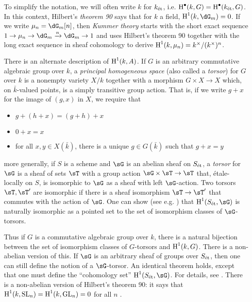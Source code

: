 \documentclass{article}
\begin{document}
To simplify the notation, we will often write $k$ for ${k}_\textnormal{\'et}$, i.e. 
$\operatorname{H}^\bullet(k,G) = \operatorname{H}^\bullet({k}_\textnormal{\'et},G)$. In this context, Hilbert's 
\emph{theorem 90} says that for $k$ a field, $\h^1(k,\dG_m) = 0$. If we write 
$\mu_n = \dG_m[n]$, then \emph{Kummer theory} starts with the short exact 
sequence $1\to \mu_n\to \dG_m\xrightarrow n \dG_m \to 1$ and uses Hilbert's 
theorem 90 together with the long exact sequence in sheaf cohomology to derive 
$\operatorname{H}^1(k,\mu_n) = k^\times / (k^\times)^n$. 

There is an alternate description of $\operatorname{H}^1(k,A)$. If $G$ is an arbitrary 
commutative algebraic group over $k$, a \emph{principal homogeneous space} 
(also called a \emph{torsor}) for $G$ over $k$ is a nonempty variety $X/k$ 
together with a morphism $G\times X\to X$ which, on $\bar k$-valued points, is 
a simply transitive group action. That is, if we write $g+x$ for the 
image of $(g,x)$ in $X$, we require that 
\begin{itemize}
  \item $g+(h+x) = (g+h)+x$ 
  \item $0+x = x$
  \item for all $x,y\in X(\bar k)$, there is a unique $g\in G(\bar k)$ such 
    that $g+x = y$
\end{itemize}
more generally, if $S$ is a scheme and $\sG$ is an abelian sheaf on ${S}_\textnormal{\'et}$, a 
\emph{torsor} for $\sG$ is a sheaf of sets $\sT$ with a group action 
$\sG\times \sT\to\sT$ that, \'etale-locally on $S$, is isomorphic to $\sG$ as 
a sheaf with left $\sG$-action. Two torsors $\sT,\sT'$ are isomorphic if there 
is a sheaf isomorphism $\sT\to \sT'$ that commutes with the action of $\sG$. 
One can show (see e.g. \cite[IV 1.1]{de77}) that $\h^1(\et S,\sG)$ is 
naturally isomorphic as a pointed set to the set of isomorphism classes of 
$\sG$-torsors. 

Thus if $G$ is a commutative algebraic group over $k$, there is a natural 
bijection between the set of isomorphism classes of $G$-torsors and 
$\operatorname{H}^1(k,G)$. There is a non-abelian version of this. If $\sG$ is an arbitrary 
sheaf of groups over ${S}_\textnormal{\'et}$, then one can still define the notion of a 
$\sG$-torsor. An identical theorem holds, except that one must define the 
``cohomology set'' $\h^1(\et S,\sG)$. For details, see \cite{sk01}. There is a 
non-abelian version of Hilbert's theorem 90: it says that 
$\operatorname{H}^1(k,\text{SL}_n) = \operatorname{H}^1(k,\text{GL}_n) = 0$ for all $n$ \cite[X 1]{se79}. 
\end{document}
